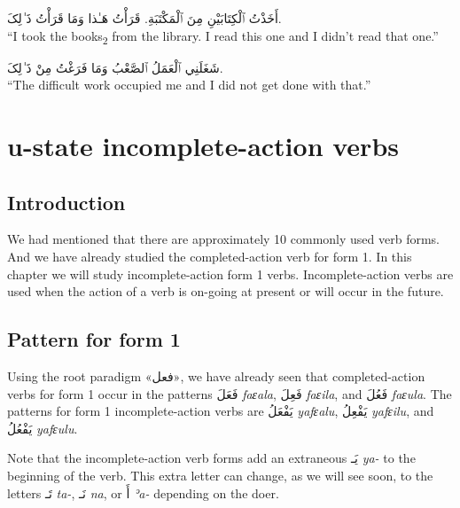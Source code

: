 \documentclass[
  10pt,
]{book}
\begin{document}
\foreignlanguage{arabic}{أَخَذْتُ ٱلْکِتَابَيْنِ مِنَ ٱلْمَکْتَبَةِ. قَرَأْتُ هَـٰذا وَمَا قَرَأْتُ ذَ~ٰلِکَ.}\\
\enquote{I took the books\textsubscript{2} from the library. I read this one and I didn't read that one.}

\foreignlanguage{arabic}{شَغَلَنِي ٱلْعَمَلُ ٱلصَّعْبُ وَمَا فَرَغْتُ مِنْ ذَ~ٰلِکَ.}\\
\enquote{The difficult work occupied me and I did not get done with that.}

\chapter{u-state incomplete-action verbs}\label{u-state-incomplete-action-verbs}

\section{Introduction}\label{introduction-15}

We had mentioned that there are approximately 10 commonly used verb forms. And we have already studied the completed-action verb for form 1. In this chapter we will study incomplete-action form 1 verbs. Incomplete-action verbs are used when the action of a verb is on-going at present or will occur in the future.

\section{Pattern for form 1}\label{pattern-for-form-1}

Using the root paradigm \foreignlanguage{arabic}{«فعل»}, we have already seen that completed-action verbs for form 1 occur in the patterns \foreignlanguage{arabic}{فَعَلَ} \emph{faɛala}, \foreignlanguage{arabic}{فَعِلَ} \emph{faɛila}, and \foreignlanguage{arabic}{فَعُلَ} \emph{faɛula}. The patterns for form 1 incomplete-action verbs are \foreignlanguage{arabic}{يَفْعَلُ} \emph{yafɛalu}, \foreignlanguage{arabic}{يَفْعِلُ} \emph{yafɛilu}, and \foreignlanguage{arabic}{يَفْعُلُ} \emph{yafɛulu}.

Note that the incomplete-action verb forms add an extraneous \foreignlanguage{arabic}{يَـ} \emph{ya-} to the beginning of the verb. This extra letter can change, as we will see soon, to the letters \foreignlanguage{arabic}{تَـ} \emph{ta-}, \foreignlanguage{arabic}{نَـ} \emph{na}, or \foreignlanguage{arabic}{أَ} \emph{ʾa-} depending on the doer.
\end{document}
